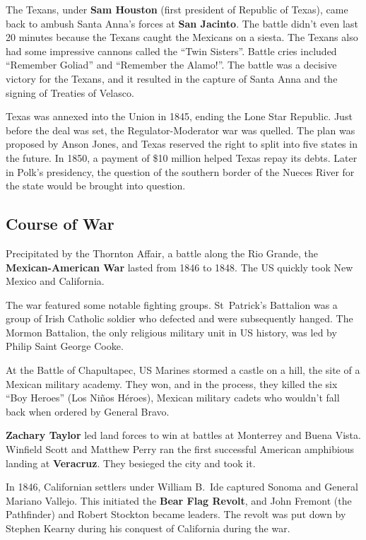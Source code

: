 The Texans, under \textbf{Sam Houston} (first president of Republic of Texas),
came back to ambush Santa Anna's forces at \textbf{San Jacinto}.
The battle didn't even last 20 minutes because the Texans caught the Mexicans on a siesta.
The Texans also had some impressive cannons called the ``Twin Sisters''.
Battle cries included ``Remember Goliad'' and ``Remember the Alamo!''.
The battle was a decisive victory for the Texans,
and it resulted in the capture of Santa Anna and the signing of Treaties of Velasco.

Texas was annexed into the Union in 1845, ending the Lone Star Republic.
Just before the deal was set, the Regulator-Moderator war was quelled.
The plan was proposed by Anson Jones, and Texas reserved the right to split into five states in the future.
In 1850, a payment of \$10 million helped Texas repay its debts.
Later in Polk's presidency,
the question of the southern border of the Nueces River for the state would be brought into question.

\subsection*{Course of War}

Precipitated by the Thornton Affair, a battle along the Rio Grande,
the \textbf{Mexican-American War} lasted from 1846 to 1848.
The US quickly took New Mexico and California.

The war featured some notable fighting groups.
St\ Patrick's Battalion was a group of Irish Catholic soldier who defected and were subsequently hanged.
The Mormon Battalion, the only religious military unit in US history, was led by Philip Saint George Cooke.

At the Battle of Chapultapec, US Marines stormed a castle on a hill, the site of a Mexican military academy.
They won, and in the process, they killed the six ``Boy Heroes'' (Los Ni\~nos H\'eroes),
Mexican military cadets who wouldn't fall back when ordered by General Bravo.

\textbf{Zachary Taylor} led land forces to win at battles at Monterrey and Buena Vista.
Winfield Scott and Matthew Perry ran the first successful American amphibious landing at \textbf{Veracruz}.
They besieged the city and took it.

In 1846, Californian settlers under William B.\ Ide captured Sonoma and General Mariano Vallejo.
This initiated the \textbf{Bear Flag Revolt}, and John Fremont (the Pathfinder) and Robert Stockton became leaders.
The revolt was put down by Stephen Kearny during his conquest of California during the war.

